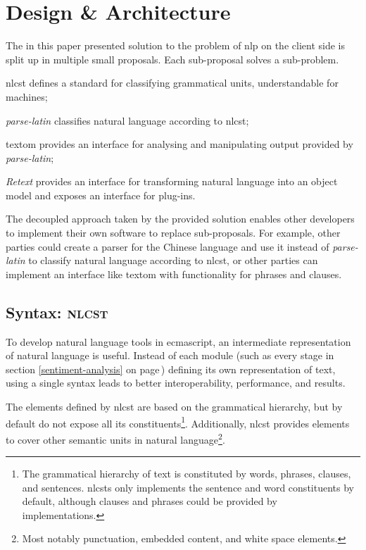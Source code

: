 \chapter{Design \& Architecture}\label{design}

The in this paper presented solution to the problem of \gls{nlp} on the
  client side is split up in multiple small proposals.
Each sub-proposal solves a sub-problem.

\begin{aenumerate}
\item\acrshort{nlcst} defines a standard for classifying grammatical units,
  understandable for machines;
\item\emph{parse-latin} classifies natural language according to
  \acrshort{nlcst};
\item\gls{textom} provides an interface for analysing and manipulating output
  provided by \emph{parse-latin};
\item\emph{Retext} provides an interface for transforming natural language
  into an object model and exposes an interface for plug-ins.
\end{aenumerate}

\noindent The decoupled approach taken by the provided solution enables other
  developers to implement their own software to replace sub-proposals.
For example, other parties could create a parser for the Chinese language and
  use it instead of \emph{parse-latin} to classify natural language according
  to \gls{nlcst}, or other parties can implement an interface like
  \gls{textom} with functionality for phrases and clauses.

\section{Syntax: \textsc{nlcst}}\label{syntax}

To develop natural language tools in \gls{ecmascript}, an intermediate
  representation of natural language is useful.
Instead of each module (such as every stage in section
  \ref{sentiment-analysis} on page\,\pageref{sentiment-analysis})
  defining its own representation of text, using a single syntax leads to
  better interoperability, performance, and results.

The elements defined by \acrfull{nlcst} are based on the grammatical
  hierarchy, but by default do not expose all its constituents\footnote{The
      grammatical hierarchy of text is constituted by words, phrases,
      clauses, and sentences.
    \glspl{nlcst} only implements the sentence and word constituents
    by default, although clauses and phrases could be provided by
    implementations.}.
Additionally, \gls{nlcst} provides elements to cover other semantic units in
  natural language\footnote{Most
    notably punctuation, embedded content, and white space elements.}.

